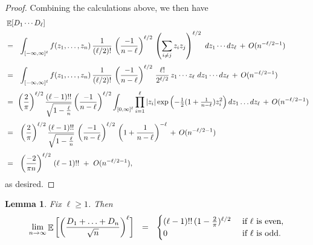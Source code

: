 \documentclass[12pt,english,reqno]{amsart}
\theoremstyle{plain}
\newtheorem{lemma}[thm]{Lemma}
\theoremstyle{remark}
\numberwithin{figure}{section}
\numberwithin{equation}{section}
\DeclareMathOperator{\Eb}{\mathbb{E}} %
\def\.{\hskip.06cm}
\begin{document}
\begin{proof}
Combining the calculations above, we then have 
\begin{align*}
	& \Eb[ D_1 \cdots D_\ell] \\
	& = \ \   \int_{[-\infty,\infty]^{\ell}}  f(z_1,\ldots, z_n) \.  \frac{1}{(\ell/2)!} \.  \left(\frac{-1}{n-\ell}\right)^{\ell/2}  \. \left( \sum_{i \neq j} z_i z_j \right)^{\ell/2} \ dz_1 \cdots dz_\ell \. + \.  O(n^{-\ell/2-1})   \\[3 pt]
		& = \ \   \int_{[-\infty,\infty]^{\ell}}  f(z_1,\ldots, z_n) \.  \frac{1}{(\ell/2)!} \.  \left(\frac{-1}{n-\ell}\right)^{\ell/2}  \.  \frac{\ell!}{2^{\ell/2}} \.  z_1 \cdots z_\ell \ dz_1 \cdots dz_\ell \. + \.  O(n^{-\ell/2-1})   \\[3 pt]
	&  = \ \left(\frac{2}{\pi}\right)^{\ell/2}  \frac{ (\ell-1)!!}{\sqrt{1-\tfrac{\ell}{n}}}  \left(\frac{-1}{n-\ell}\right)^{\ell/2} \int_{[0,\infty]^{\ell}} \prod_{i=1}^\ell  |z_i| \exp\left(-\tfrac{1}{2}(1+\tfrac{1}{n-\ell}) z_i^2\right)  	 dz_1 \ldots dz_\ell
    \.+\. O(n^{-\ell/2-1}) \\[3 pt]
	& = \ \  \left(\frac{2}{\pi}\right)^{\ell/2}  \frac{ (\ell-1)!!}{\sqrt{1-\tfrac{\ell}{n}}}  \. \left(\frac{-1}{n-\ell}\right)^{\ell/2} \.   \left(1+\frac{1}{n-\ell} \right)^{-\ell}
	\. +  \. O(n^{-\ell/2-1}) \\[3 pt]
	& = \ \ \left(\frac{-2}{ \pi n}\right)^{\ell/2} \. {(\ell-1)!!} \  + \ O(n^{-\ell/2-1}),
\end{align*}
as desired.
	\end{proof}
	
	\smallskip
	
\begin{lemma}\label{lem:T_i}
	Fix $\ell \geq 1$. Then
	\begin{equation*}
	\lim_{n \to \infty} \Eb\bigg[	\bigg(\frac{D_1+\ldots+D_n}{\sqrt{n}}\bigg)^{\ell} \bigg] \ \ = \ \ 
	\begin{cases}
(\ell-1)!! \. (1-\tfrac{2}{\pi})^{\ell/2} & \text{ if $\ell$ is even},\\
0 & \text{ if $\ell$ is odd}.
	\end{cases}
	\end{equation*}
\end{lemma}
	
	\smallskip
	
\end{document}
